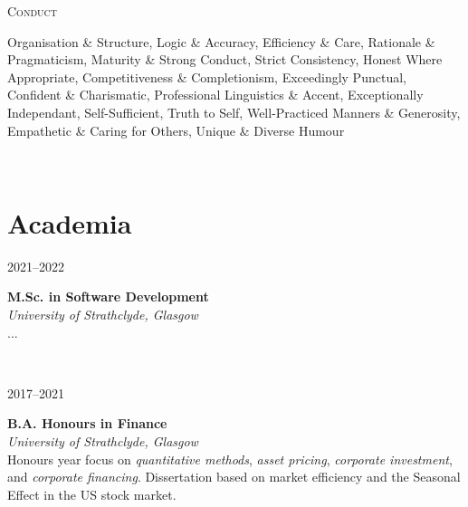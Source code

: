 \documentclass[11pt, english]{article}
\begin{document}
{\begin{minipage}[t]{.15\linewidth}
        \hfill                    
	\textsc{Conduct}
\end{minipage}                                        
\hfill\vline\hfill                                   
\begin{minipage}[t]{.80\linewidth}                   	
	Organisation \& Structure, Logic \& Accuracy, Efficiency \& Care, Rationale \& Pragmaticism, Maturity \& Strong Conduct, Strict Consistency, Honest Where Appropriate, Competitiveness \& Completionism, Exceedingly Punctual, Confident \& Charismatic, Professional Linguistics \& Accent, Exceptionally Independant, Self-Sufficient, Truth to Self, Well-Practiced Manners \& Generosity, Empathetic \& Caring for Others, Unique \& Diverse Humour
\end{minipage}\\                                                                      

\section{Academia}

\begin{minipage}[t]{.15\linewidth}
	\hfill 
	\textsc{2021--2022}
\end{minipage}
\hfill\vline\hfill
\begin{minipage}[t]{.80\linewidth}
	\textbf{M.Sc. in Software Development}\\
	\textit{University of Strathclyde, Glasgow}\\ 
	...
\end{minipage}\\

\begin{minipage}[t]{.15\linewidth}
	\hfill 
	\textsc{2017--2021}
\end{minipage}
\hfill\vline\hfill
\begin{minipage}[t]{.80\linewidth}
	\textbf{B.A. Honours in Finance}\\
	\textit{University of Strathclyde, Glasgow}\\ 
	Honours year focus on \textit{quantitative methods}, \textit{asset pricing}, \textit{corporate investment}, and \textit{corporate financing}. Dissertation based on market efficiency and the Seasonal Effect in the US stock market.
\end{minipage}\\

}
\end{document}
